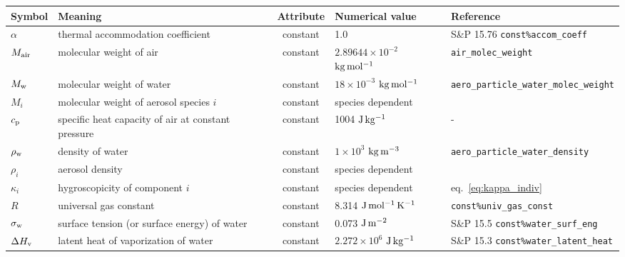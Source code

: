 \documentclass{article}
\begin{document}
\vspace{2cm}
\begin{tabular}{lp{4cm}clp{3cm}}
\hline Symbol & Meaning  &  Attribute  & Numerical value &  Reference    \\
\hline             
$\alpha$   &  thermal accommodation coefficient   & constant   & 1.0 & S\&P 15.76  \verb+const%accom_coeff+ \\
$M_{\rm air} $      &  molecular weight of air  &   constant  & $2.89644 \times 10^{-2} $  $\rm{kg \,mol^{-1}}$ &  \verb+air_molec_weight+   \\
$M_{\rm w} $    &  molecular weight of water  &  constant & $18\times10^{-3}$ $\rm{kg \, mol^{-1}}  $  &  \verb+aero_particle_water_molec_weight+    \\
$M_i $      &  molecular weight of aerosol species $i$  &   constant  & species dependent &    \\
$c_{\rm p}$       &  specific heat capacity of air at constant pressure  & constant & 1004 $\rm{J \, kg^{-1}}$ & -     \\
$\rho_{\rm w}$ &  density of water & constant  & $1\times10^{3}$ $\rm{kg \, m^{-3}}  $ &   \verb+aero_particle_water_density+ \\ 
$ \rho_i$    &  aerosol density  &  constant  & species dependent  &     \\
$\kappa_i$      &  hygroscopicity of component $i$   &  constant & species dependent  &  eq.~\ref{eq:kappa_indiv}   \\
$R$     &  universal gas constant  &  constant   & 8.314 $\rm{J \, mol^{-1}\, K^{-1}}$   &  \verb+const%univ_gas_const+ \\
$\sigma_{\rm w}$     &  surface tension (or surface energy) of water  &  constant  & 0.073 $\rm{J \, m^{-2}}$ & S\&P 15.5  \verb+const%water_surf_eng+  \\
$\Delta H_{\rm  v}$  & latent heat of vaporization of water   &  constant  & $2.272\times10^{6}$ $\rm{J \, kg^{-1}}$ &  S\&P 15.3 \verb+const%water_latent_heat+ \\ 


\end{tabular}
\end{document}
